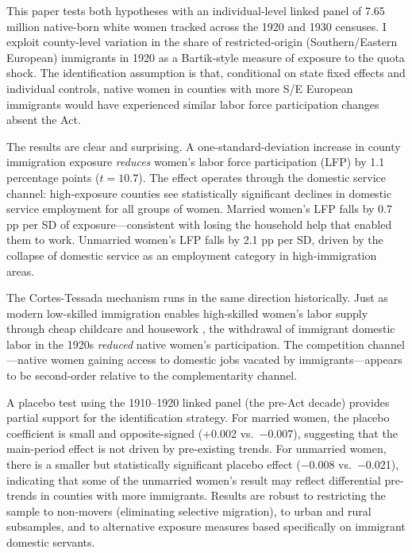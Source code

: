 \documentclass[12pt]{article}
\begin{document}
This paper tests both hypotheses with an individual-level linked panel of 7.65 million native-born white women tracked across the 1920 and 1930 censuses. I exploit county-level variation in the share of restricted-origin (Southern/Eastern European) immigrants in 1920 as a Bartik-style measure of exposure to the quota shock. The identification assumption is that, conditional on state fixed effects and individual controls, native women in counties with more S/E European immigrants would have experienced similar labor force participation changes absent the Act.

The results are clear and surprising. A one-standard-deviation increase in county immigration exposure \emph{reduces} women's labor force participation (LFP) by 1.1 percentage points ($t = 10.7$). The effect operates through the domestic service channel: high-exposure counties see statistically significant declines in domestic service employment for all groups of women. Married women's LFP falls by 0.7 pp per SD of exposure---consistent with losing the household help that enabled them to work. Unmarried women's LFP falls by 2.1 pp per SD, driven by the collapse of domestic service as an employment category in high-immigration areas.

The Cortes-Tessada mechanism runs in the same direction historically. Just as modern low-skilled immigration enables high-skilled women's labor supply through cheap childcare and housework \citep{CortesTossada2011, Barone2012, Farr2012}, the withdrawal of immigrant domestic labor in the 1920s \emph{reduced} native women's participation. The competition channel---native women gaining access to domestic jobs vacated by immigrants---appears to be second-order relative to the complementarity channel.

A placebo test using the 1910--1920 linked panel (the pre-Act decade) provides partial support for the identification strategy. For married women, the placebo coefficient is small and opposite-signed (+0.002 vs.\ $-$0.007), suggesting that the main-period effect is not driven by pre-existing trends. For unmarried women, there is a smaller but statistically significant placebo effect ($-$0.008 vs.\ $-$0.021), indicating that some of the unmarried women's result may reflect differential pre-trends in counties with more immigrants. Results are robust to restricting the sample to non-movers (eliminating selective migration), to urban and rural subsamples, and to alternative exposure measures based specifically on immigrant domestic servants.
\end{document}
